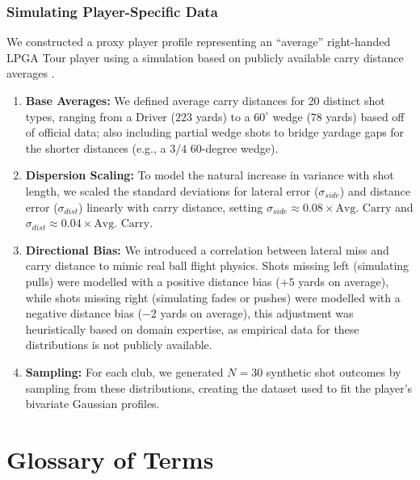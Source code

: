 \documentclass[11pt, letterpaper]{article}
\begin{document}
\subsubsection{Simulating Player-Specific Data}
\label{app: player-data}
We constructed a proxy player profile representing an ``average'' right-handed LPGA Tour player using a simulation based on publicly available carry distance averages \parencite{trackman2024averages}.
\begin{enumerate}\item 
\textbf{Base Averages:} We defined average carry distances for 20 distinct shot types, ranging from a Driver ($223$ yards) to a $60^{\circ}$ wedge ($78$ yards) based off of official data; also including partial wedge shots to bridge yardage gaps for the shorter distances (e.g., a $3/4$ 60-degree wedge). 
\item \textbf{Dispersion Scaling:} To model the natural increase in variance with shot length, we scaled the standard deviations for lateral error ($\sigma_{side}$) and distance error ($\sigma_{dist}$) linearly with carry distance, setting $\sigma_{side} \approx 0.08 \times \text{Avg. Carry}$ and $\sigma_{dist} \approx 0.04 \times \text{Avg. Carry}$. 
\item \textbf{Directional Bias:} We introduced a correlation between lateral miss and carry distance to mimic real ball flight physics. Shots missing left (simulating pulls) were modelled with a positive distance bias ($+5$ yards on average), while shots missing right (simulating fades or pushes) were modelled with a negative distance bias ($-2$ yards on average), this adjustment was heuristically based on domain expertise, as empirical data for these distributions is not publicly available.
\item \textbf{Sampling:} For each club, we generated $N=30$ synthetic shot outcomes by sampling from these distributions, creating the dataset used to fit the player's bivariate Gaussian profiles.
\end{enumerate}

\section{Glossary of Terms}
\label{sec:Appendix2}
\end{document}
